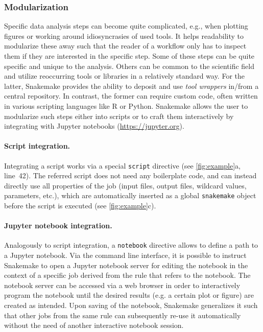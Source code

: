 \documentclass[parskip=half]{scrartcl}
\let\plainurl\url
\renewcommand{\url}[1]{\protect\plainurl{#1}}
\begin{document}
\subsubsection{Modularization}\label{sec:modularization}

Specific data analysis steps can become quite complicated, e.g., when plotting figures or working around idiosyncrasies of used tools.
It helps readability to modularize these away such that the reader of a workflow only has to inspect them if they are interested in the specific step.
Some of these steps can be quite specific and unique to the analysis.
Others can be common to the scientific field and utilize reoccurring tools or libraries in a relatively standard way.
For the latter, Snakemake provides the ability to deposit and use \emph{tool wrappers} in/from a central repository.
In contrast, the former can require custom code, often written in various scripting languages like R or Python.
Snakemake allows the user to modularize such steps either into scripts or to craft them interactively by integrating with Jupyter notebooks (\url{https://jupyter.org}).

\paragraph{Script integration.}
Integrating a script works via a special \lstinline!script! directive (see \autoref{fig:example}a, line~42).
The referred script does not need any boilerplate code, and can instead directly use all properties of the job (input files, output files, wildcard values, parameters, etc.), which are automatically inserted as a global \lstinline!snakemake! object before the script is executed (see \autoref{fig:example}c).

\paragraph{Jupyter notebook integration.}
Analogously to script integration, a \lstinline!notebook! directive allows to define a path to a Jupyter notebook.
Via the command line interface, it is possible to instruct Snakemake to open a Jupyter notebook server for editing the notebook in the context of a specific job derived from the rule that refers to the notebook.
The notebook server can be accessed via a web browser in order to interactively program the notebook until the desired results (e.g. a certain plot or figure) are created as intended.
Upon saving of the notebook, Snakemake generalizes it such that other jobs from the same rule can subsequently re-use it automatically without the need of another interactive notebook session.
\end{document}

